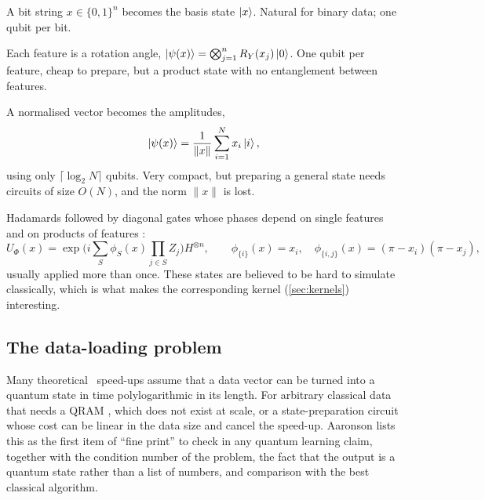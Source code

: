 \documentclass[11pt,a4paper]{article}
\begin{document}
\begin{description}[style=nextline,leftmargin=1.2em]
  \item[Basis encoding] A bit string $x\in\{0,1\}^n$ becomes the basis state $\ket{x}$. Natural for
        binary data; one qubit per bit.
  \item[Angle encoding] Each feature is a rotation angle,
        $\ket{\psi(x)}=\bigotimes_{j=1}^{n}R_Y(x_j)\ket{0}$. One qubit per feature, cheap to prepare,
        but a product state with no entanglement between features.
  \item[Amplitude encoding] A normalised vector becomes the amplitudes,
        \begin{equation}
          \ket{\psi(x)}=\frac{1}{\lVert x\rVert}\sum_{i=1}^{N}x_i\ket{i},
        \end{equation}
        using only $\lceil\log_2N\rceil$ qubits. Very compact, but preparing a general state needs
        circuits of size $O(N)$, and the norm $\lVert x\rVert$ is lost.
  \item[IQP / ZZ feature maps] Hadamards followed by diagonal gates whose phases depend on
        single features and on products of features \citep{havlicek2019}:
        \begin{equation}
          U_{\Phi}(x)=\exp\!\Big(i\sum_{S}\phi_S(x)\prod_{j\in S}Z_j\Big)H^{\otimes n},\qquad
          \phi_{\{i\}}(x)=x_i,\quad \phi_{\{i,j\}}(x)=(\pi-x_i)(\pi-x_j),
        \end{equation}
        usually applied more than once. These states are believed to be hard to simulate
        classically, which is what makes the corresponding kernel (\cref{sec:kernels}) interesting.
\end{description}

\subsection{The data-loading problem}
\label{sec:loading}
Many theoretical \CQ\ speed-ups assume that a data vector can be turned into a quantum state in time
polylogarithmic in its length. For arbitrary classical data that needs a QRAM \citep{giovannetti2008qram},
which does not exist at scale, or a state-preparation circuit whose cost can be linear in the data
size and cancel the speed-up. Aaronson \citeyearpar{aaronson2015} lists this as the first item of ``fine
print'' to check in any quantum learning claim, together with the condition number of the problem,
the fact that the output is a quantum state rather than a list of numbers, and comparison with the
best classical algorithm.
\end{document}
